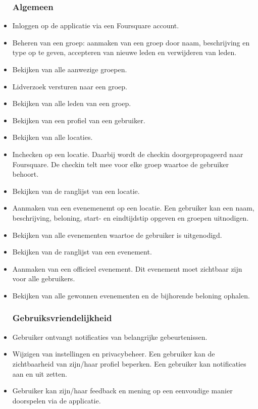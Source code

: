 \begin{itemize}
	
\subsubsection{Algemeen}
\item Inloggen op de applicatie via een Foursquare account.
\item Beheren van een groep: aanmaken van een groep door naam, beschrijving en type op te geven, accepteren van nieuwe leden en verwijderen van leden.   
\item Bekijken van alle aanwezige groepen.
\item Lidverzoek versturen naar een groep.
\item Bekijken van alle leden van een groep.
\item Bekijken van een profiel van een gebruiker.
\item Bekijken van alle locaties.
\item Inchecken op een locatie. Daarbij wordt de checkin doorgepropageerd naar Foursquare. De checkin telt mee voor elke groep waartoe de gebruiker behoort. 
\item Bekijken van de ranglijst van een locatie.
\item Aanmaken van een evenemenemt op een locatie. Een gebruiker kan een naam, beschrijving, beloning, start- en eindtijdstip opgeven en groepen uitnodigen.
\item Bekijken van alle evenementen waartoe de gebruiker is uitgenodigd.
\item Bekijken van de ranglijst van een evenement.
\item Aanmaken van een officieel evenement. Dit evenement moet zichtbaar zijn voor alle gebruikers.
\item Bekijken van alle gewonnen evenementen en de bijhorende beloning ophalen.

\subsubsection{Gebruiksvriendelijkheid}

\item Gebruiker ontvangt notificaties van belangrijke gebeurtenissen.
\item Wijzigen van instellingen en privacybeheer. Een gebruiker kan de zichtbaarheid van zijn/haar profiel beperken. Een gebruiker kan notificaties aan en uit zetten.
\item Gebruiker kan zijn/haar feedback en mening op een eenvoudige manier doorspelen via de applicatie.

\end{itemize}
